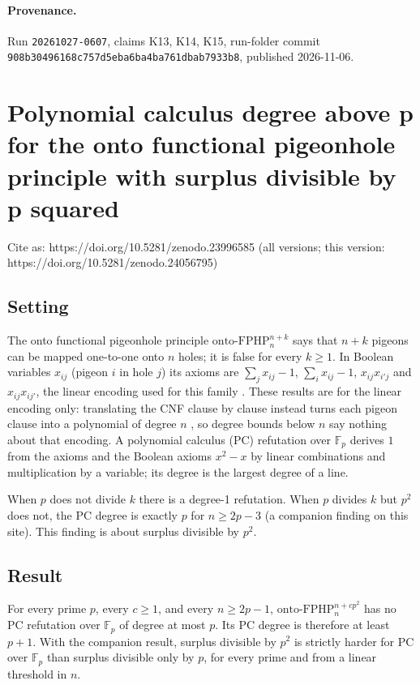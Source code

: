 \documentclass{article}
\begin{document}
\paragraph{Provenance.}
Run \texttt{20261027-0607}, claims K13, K14, K15, run-folder commit \texttt{908b30496168c757d5eba6ba4ba761dbab7933b8}, published 2026-11-06.

\section{Polynomial calculus degree above p for the onto functional pigeonhole principle with surplus divisible by p squared}
\label{sec:pc-degree-above-p-onto-fphp-surplus-p-squared}

Cite as: https://doi.org/10.5281/zenodo.23996585 (all versions; this version: https://doi.org/10.5281/zenodo.24056795)

\subsection*{Setting}

The onto functional pigeonhole principle $\mathrm{onto\text{-}FPHP}^{n+k}_n$ says that $n+k$
pigeons can be mapped one-to-one onto $n$ holes; it is false for every $k\ge1$. In Boolean
variables $x_{ij}$ (pigeon $i$ in hole $j$) its axioms are $\sum_j x_{ij}-1$,
$\sum_i x_{ij}-1$, $x_{ij}x_{i'j}$ and $x_{ij}x_{ij'}$, the linear encoding used for this family
\cite{beame1998counting,razborov2001php}. These results are for the linear encoding only: translating the CNF clause by clause instead turns each pigeon clause into a polynomial of degree $n$ \cite{razborov2001php}, so degree bounds below $n$ say nothing about that encoding. A polynomial calculus (PC) refutation over
$\mathbb F_p$ derives $1$ from the axioms and the Boolean axioms $x^2-x$ by linear combinations
and multiplication by a variable; its degree is the largest degree of a line.

When $p$ does not divide $k$ there is a degree-1 refutation. When $p$ divides $k$ but $p^2$ does
not, the PC degree is exactly $p$ for $n\ge2p-3$ (a companion finding on this site). This finding
is about surplus divisible by $p^2$.

\subsection*{Result}

For every prime $p$, every $c\ge1$, and every $n\ge2p-1$, $\mathrm{onto\text{-}FPHP}^{n+cp^2}_n$ has
no PC refutation over $\mathbb F_p$ of degree at most $p$. Its PC degree is therefore at least
$p+1$. With the companion result, surplus divisible by $p^2$ is strictly harder for PC over
$\mathbb F_p$ than surplus divisible only by $p$, for every prime and from a linear threshold in
$n$.
\end{document}
